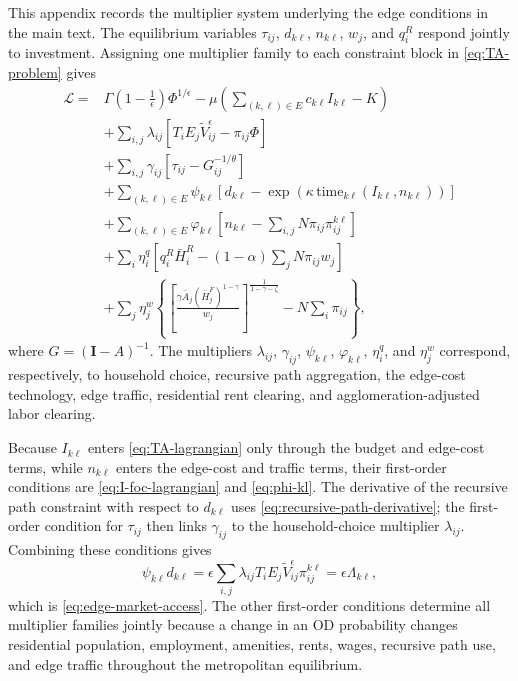 \documentclass[12pt, a4paper]{article}
\theoremstyle{definition}
\theoremstyle{remark}
\begin{document}
This appendix records the multiplier system underlying the edge conditions in the main text. The equilibrium variables $\tau_{ij}$, $d_{k\ell}$, $n_{k\ell}$, $w_j$, and $q_i^R$ respond jointly to investment. Assigning one multiplier family to each constraint block in \eqref{eq:TA-problem} gives
\begin{align}
    \label{eq:TA-lagrangian}
\mathcal L
={}&
\Gamma\!\left(1-\tfrac1\epsilon\right)\Phi^{1/\epsilon}
-\mu\left(\sum_{(k,\ell)\in E}c_{k\ell}I_{k\ell}-K\right)
\nonumber\\
&+
\sum_{i,j}\lambda_{ij}
\left[
T_iE_j\tilde V_{ij}^{\epsilon}-\pi_{ij}\Phi
\right]
\nonumber\\
&+
\sum_{i,j}\gamma_{ij}
\left[
\tau_{ij}-G_{ij}^{-1/\theta}
\right]
\nonumber\\
&+
\sum_{(k,\ell)\in E}\psi_{k\ell}
\left[
d_{k\ell}
-\exp\!\left(
\kappa\,\mathrm{time}_{k\ell}(I_{k\ell},n_{k\ell})
\right)
\right]
\nonumber\\
&+
\sum_{(k,\ell)\in E}\varphi_{k\ell}
\left[
n_{k\ell}
-\sum_{i,j}N\pi_{ij}\pi_{ij}^{k\ell}
\right]
\nonumber\\
&+
\sum_i\eta_i^q
\left[
q_i^R\bar H_i^R
-(1-\alpha)\sum_jN\pi_{ij}w_j
\right]
\nonumber\\
&+
\sum_j\eta_j^w
\left\{
\left[
\frac{\gamma\bar A_j(\bar H_j^F)^{1-\gamma}}{w_j}
\right]^{\!\frac{1}{1-\gamma-\zeta}}
-N\sum_i\pi_{ij}
\right\},
\end{align}
where $G=(\mathbf I-A)^{-1}$. The multipliers $\lambda_{ij}$, $\gamma_{ij}$, $\psi_{k\ell}$, $\varphi_{k\ell}$, $\eta_i^q$, and $\eta_j^w$ correspond, respectively, to household choice, recursive path aggregation, the edge-cost technology, edge traffic, residential rent clearing, and agglomeration-adjusted labor clearing.

Because $I_{k\ell}$ enters \eqref{eq:TA-lagrangian} only through the budget and edge-cost terms, while $n_{k\ell}$ enters the edge-cost and traffic terms, their first-order conditions are \eqref{eq:I-foc-lagrangian} and \eqref{eq:phi-kl}. The derivative of the recursive path constraint with respect to $d_{k\ell}$ uses \eqref{eq:recursive-path-derivative}; the first-order condition for $\tau_{ij}$ then links $\gamma_{ij}$ to the household-choice multiplier $\lambda_{ij}$. Combining these conditions gives
\[
\psi_{k\ell}d_{k\ell}
=
\epsilon
\sum_{i,j}
\lambda_{ij}T_iE_j\tilde V_{ij}^{\epsilon}
\pi_{ij}^{k\ell}
=
\epsilon\Lambda_{k\ell},
\]
which is \eqref{eq:edge-market-access}. The other first-order conditions determine all multiplier families jointly because a change in an OD probability changes residential population, employment, amenities, rents, wages, recursive path use, and edge traffic throughout the metropolitan equilibrium.


\printbibliography
\end{document}
